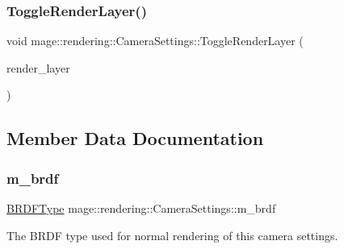 \hypertarget{classmage_1_1rendering_1_1_camera_settings_a95c531aba7bbddba9ea47000de3c53b2}{}\label{classmage_1_1rendering_1_1_camera_settings_a95c531aba7bbddba9ea47000de3c53b2} 
\subsubsection{\texorpdfstring{Toggle\+Render\+Layer()}{ToggleRenderLayer()}}
{\footnotesize\ttfamily void mage\+::rendering\+::\+Camera\+Settings\+::\+Toggle\+Render\+Layer (\begin{DoxyParamCaption}\item[{\hyperlink{namespacemage_1_1rendering_a466c2a441ea5b26e4625c2f34e021b3d}{Render\+Layer}}]{render\+\_\+layer }\end{DoxyParamCaption})\hspace{0.3cm}{\ttfamily [noexcept]}}



\subsection{Member Data Documentation}
\hypertarget{classmage_1_1rendering_1_1_camera_settings_a763ee095ffc7143b9afdc7a6a658f2a8}{}\label{classmage_1_1rendering_1_1_camera_settings_a763ee095ffc7143b9afdc7a6a658f2a8} 
\subsubsection{\texorpdfstring{m\+\_\+brdf}{m\_brdf}}
{\footnotesize\ttfamily \hyperlink{namespacemage_1_1rendering_a13c5e70586af4ce254146074ec055bf6}{B\+R\+D\+F\+Type} mage\+::rendering\+::\+Camera\+Settings\+::m\+\_\+brdf\hspace{0.3cm}{\ttfamily [private]}}

The B\+R\+DF type used for normal rendering of this camera settings. \hypertarget{classmage_1_1rendering_1_1_camera_settings_a173329d1022c717efe29e33eaa554d18}{}\label{classmage_1_1rendering_1_1_camera_settings_a173329d1022c717efe29e33eaa554d18} 
